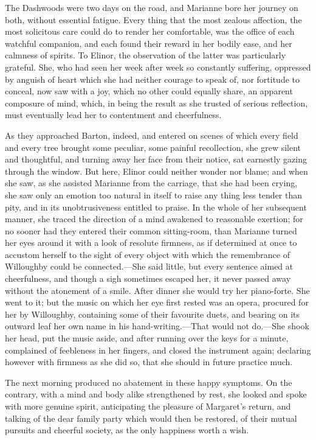 The Dashwoods were two days on the road, and Marianne bore her journey on both, without essential fatigue. Every thing that the most zealous affection, the most solicitous care could do to render her comfortable, was the office of each watchful companion, and each found their reward in her bodily ease, and her calmness of spirits. To Elinor, the observation of the latter was particularly grateful. She, who had seen her week after week so constantly suffering, oppressed by anguish of heart which she had neither courage to speak of, nor fortitude to conceal, now saw with a joy, which no other could equally share, an apparent composure of mind, which, in being the result as she trusted of serious reflection, must eventually lead her to contentment and cheerfulness.

As they approached Barton, indeed, and entered on scenes of which every field and every tree brought some peculiar, some painful recollection, she grew silent and thoughtful, and turning away her face from their notice, sat earnestly gazing through the window. But here, Elinor could neither wonder nor blame; and when she saw, as she assisted Marianne from the carriage, that she had been crying, she saw only an emotion too natural in itself to raise any thing less tender than pity, and in its unobtrusiveness entitled to praise. In the whole of her subsequent manner, she traced the direction of a mind awakened to reasonable exertion; for no sooner had they entered their common sitting-room, than Marianne turned her eyes around it with a look of resolute firmness, as if determined at once to accustom herself to the sight of every object with which the remembrance of Willoughby could be connected.---She said little, but every sentence aimed at cheerfulness, and though a sigh sometimes escaped her, it never passed away without the atonement of a smile. After dinner she would try her piano-forte. She went to it; but the music on which her eye first rested was an opera, procured for her by Willoughby, containing some of their favourite duets, and bearing on its outward leaf her own name in his hand-writing.---That would not do.---She shook her head, put the music aside, and after running over the keys for a minute, complained of feebleness in her fingers, and closed the instrument again; declaring however with firmness as she did so, that she should in future practice much.

The next morning produced no abatement in these happy symptoms. On the contrary, with a mind and body alike strengthened by rest, she looked and spoke with more genuine spirit, anticipating the pleasure of Margaret's return, and talking of the dear family party which would then be restored, of their mutual pursuits and cheerful society, as the only happiness worth a wish.

